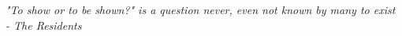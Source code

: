 \documentclass[
	oldfontcommands,
	sumario=abnt-6027-2012,
	12pt,			%
	openright,		%
	oneside,		%
	a4paper,		%
	english,		%
	brazil			%
	]{imecc-unicamp}
\begin{document}
\begin{epigrafe}
    \vspace*{\fill}
    \begin{flushright}
	\textit{"To show or to be shown?" is a question never,
		even not known by many to exist - The Residents
	}
    \end{flushright}
\end{epigrafe}



\tableofcontents*
\cleardoublepage
\textual

% 
% 
% 
% 
% 
% 
% 
\end{document}

